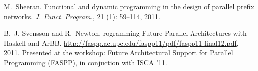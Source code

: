\documentclass{sigplanconf}
\begin{document}
\begin{thebibliography}{}
M.~Sheeran.
\newblock Functional and dynamic programming in the design of parallel prefix
  networks.
\newblock \emph{J. Funct. Program.}, 21 (1): 59--114, 2011.

B.~J. Svensson and R.~Newton.
rogramming {F}uture {P}arallel {A}rchitectures with {H}askell and
  {A}r{BB}.
\newblock \url{http://faspp.ac.upc.edu/faspp11/pdf/faspp11-final12.pdf}, 2011.
\newblock Presented at the workshop: {F}uture {A}rchitectural {S}upport for
  {P}arallel {P}rogramming (FASPP), in conjuction with ISCA '11.


\end{thebibliography}
%
\end{document}

